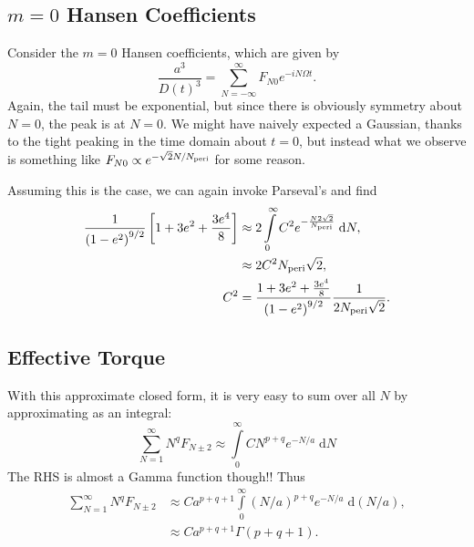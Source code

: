 \documentclass[11pt,
        usenames, %
        dvipsnames %
    ]{article}
\newcommand*{\p}[1]{\left(#1\right)}
\newcommand*{\s}[1]{\left[#1\right]}
\begin{document}
\subsection{$m = 0$ Hansen Coefficients}

Consider the $m = 0$ Hansen coefficients, which are given by
\begin{equation}
    \frac{a^3}{D(t)^3} = \sum\limits_{N = -\infty}^\infty
        F_{N0} e^{-iN\Omega t}.
\end{equation}
Again, the tail must be exponential, but since there is obviously symmetry about
$N = 0$, the peak is at $N = 0$. We might have naively expected a Gaussian,
thanks to the tight peaking in the time domain about $t = 0$, but instead what
we observe is something like $F_{N0} \propto e^{-\sqrt{2}N/N_{\rm peri}}$ for
some reason.

Assuming this is the case, we can again invoke Parseval's and find
\begin{align}
    \frac{1}{\p{1 - e^2}^{9/2}}\s{1 + 3e^2 + \frac{3e^4}{8}}
        &\approx 2\int\limits_0^\infty C^2e^{-\frac{N2\sqrt{2}}{N_{\rm peri}}}
            \;\mathrm{d}N,\\
        &\approx 2C^2N_{\rm peri}\sqrt{2},\\
    C^2 &= \frac{1 + 3e^2 + \frac{3e^4}{8}}{\p{1 - e^2}^{9/2}}
        \frac{1}{2N_{\rm peri}\sqrt{2}}.
\end{align}

\subsection{Effective Torque}

With this approximate closed form, it is very easy to sum over all $N$ by
approximating as an integral:
\begin{equation}
    \sum\limits_{N = 1}^\infty N^q F_{N \pm 2}
        \approx \int\limits_0^\infty CN^{p + q}e^{-N/a}\;\mathrm{d}N
\end{equation}
The RHS is almost a Gamma function though!! Thus
\begin{align}
    \sum\limits_{N = 1}^\infty N^q F_{N \pm 2} &\approx
        Ca^{p + q + 1}
        \int\limits_0^\infty (N / a)^{p + q}e^{-N/a}\;\mathrm{d}(N/a),\\
        &\approx Ca^{p + q + 1} \Gamma\p{p + q + 1}.
\end{align}
\end{document}
